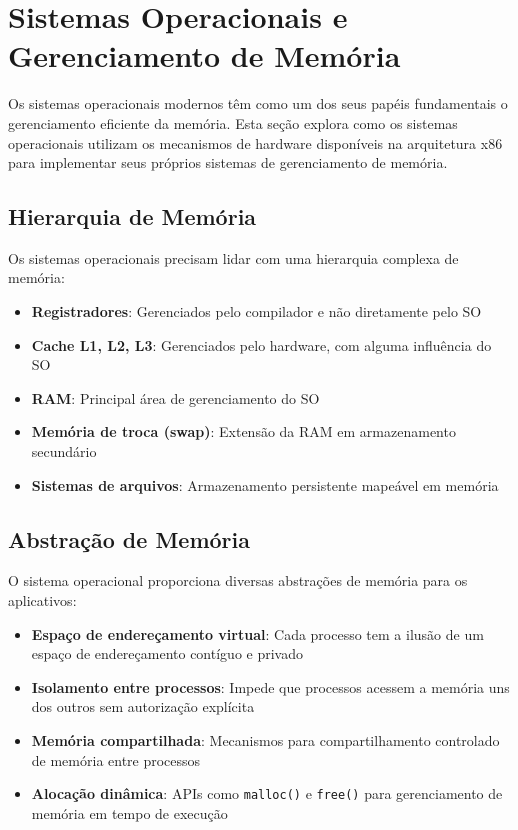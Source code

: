 \section{Sistemas Operacionais e Gerenciamento de Memória}
\label{sec:b03_sistemas_operacionais}

Os sistemas operacionais modernos têm como um dos seus papéis fundamentais o gerenciamento eficiente da memória. Esta seção explora como os sistemas operacionais utilizam os mecanismos de hardware disponíveis na arquitetura x86 para implementar seus próprios sistemas de gerenciamento de memória.

\subsection{Hierarquia de Memória}
\label{subsec:hierarquia_memoria}

Os sistemas operacionais precisam lidar com uma hierarquia complexa de memória:

\begin{itemize}
    \item \textbf{Registradores}: Gerenciados pelo compilador e não diretamente pelo SO
    \item \textbf{Cache L1, L2, L3}: Gerenciados pelo hardware, com alguma influência do SO
    \item \textbf{RAM}: Principal área de gerenciamento do SO
    \item \textbf{Memória de troca (swap)}: Extensão da RAM em armazenamento secundário
    \item \textbf{Sistemas de arquivos}: Armazenamento persistente mapeável em memória
\end{itemize}

\subsection{Abstração de Memória}
\label{subsec:abstracao_memoria}

O sistema operacional proporciona diversas abstrações de memória para os aplicativos:

\begin{itemize}
    \item \textbf{Espaço de endereçamento virtual}: Cada processo tem a ilusão de um espaço de endereçamento contíguo e privado

    \item \textbf{Isolamento entre processos}: Impede que processos acessem a memória uns dos outros sem autorização explícita

    \item \textbf{Memória compartilhada}: Mecanismos para compartilhamento controlado de memória entre processos

    \item \textbf{Alocação dinâmica}: APIs como \texttt{malloc()} e \texttt{free()} para gerenciamento de memória em tempo de execução
\end{itemize}

